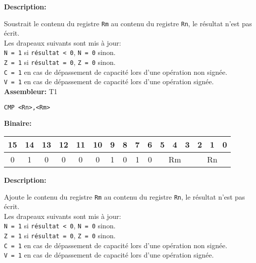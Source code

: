 \documentclass{article}
\begin{document}

    \textbf{Description: }

    Soustrait le contenu du registre \texttt{Rm} au contenu du registre \texttt{Rn}, le résultat n'est pas écrit.\\
    Les drapeaux suivants sont mis à jour:\\
    \texttt{N = 1} si \texttt{résultat < 0}, \texttt{N = 0} sinon.\\
    \texttt{Z = 1} si \texttt{résultat = 0}, \texttt{Z = 0} sinon.\\
    \texttt{C = 1} en cas de dépassement de capacité lors d'une opération non signée.\\
    \texttt{V = 1} en cas de dépassement de capacité lors d'une opération signée.\\

    \textbf{Assembleur:} T1

    \begin{lstlisting}
CMP <Rn>,<Rm>
    \end{lstlisting}

    \textbf{Binaire:}\\

    \begin{tabular}{| c c c c c c c c c c c c c c c c |}
        \hline
        15 & 14 & 13 & 12 & 11 & 10 & \multicolumn{1}{|c}{9} & 8 & 7 & 6 & \multicolumn{1}{|c}{5} & 4 & 3 & \multicolumn{1}{|c}{2} & 1 & 0 \\
        \hline
        0 & 1 & 0 & 0 & 0 & 0 & \multicolumn{1}{|c}{1} & 0 & 1 & 0 & \multicolumn{3}{|c}{Rm} & \multicolumn{3}{|c|}{Rn} \\
        \hline
    \end{tabular}



    \textbf{Description: }

    Ajoute le contenu du registre \texttt{Rm} au contenu du registre \texttt{Rn}, le résultat n'est pas écrit.\\
    Les drapeaux suivants sont mis à jour:\\
    \texttt{N = 1} si \texttt{résultat < 0}, \texttt{N = 0} sinon.\\
    \texttt{Z = 1} si \texttt{résultat = 0}, \texttt{Z = 0} sinon.\\
    \texttt{C = 1} en cas de dépassement de capacité lors d'une opération non signée.\\
    \texttt{V = 1} en cas de dépassement de capacité lors d'une opération signée.\\
\end{document}
